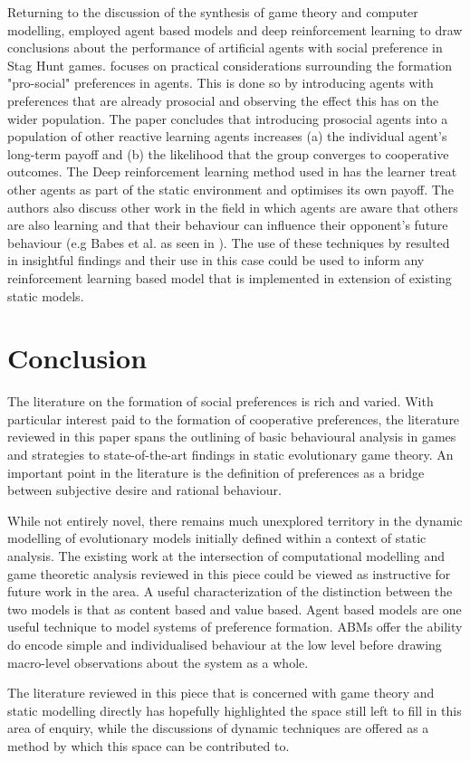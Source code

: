 \documentclass[11pt]{article}
\newcommand*{\np}{\par\noindent\newline}
\begin{document}
\np Returning to the discussion of the synthesis of game theory and computer modelling, \citet{peysakhovich_prosocial_2017} employed agent based models and deep reinforcement learning to draw conclusions about the
performance of artificial agents with social preference in Stag Hunt games. \citet{peysakhovich_prosocial_2017} focuses
on practical considerations surrounding the formation "pro-social" preferences in agents. This is done so by introducing
agents with preferences that are already prosocial and observing the effect this has on the wider population. The paper
concludes that introducing prosocial agents into a population of other reactive learning agents increases (a) the
individual agent's long-term payoff and (b) the likelihood that the group converges to cooperative outcomes.
The Deep reinforcement learning method used in \citet{peysakhovich_prosocial_2017} has the learner treat other agents as
part of the static environment and optimises its own payoff. The authors also discuss other work in the field in which
agents are aware that others are also learning and that their behaviour can influence their opponent's future behaviour
(e.g Babes et al. as seen in \citealt{peysakhovich_prosocial_2017}). The use of these techniques by 
\citet{peysakhovich_prosocial_2017} resulted in insightful findings and their use in this case could be used to inform any reinforcement learning based model that is implemented in extension of existing static models.


\section{Conclusion}\label{conc}
The literature on the formation of social preferences is rich and varied. With particular interest paid to the formation
of cooperative preferences, the literature reviewed in this paper spans the outlining of basic behavioural analysis in
games and strategies to state-of-the-art findings in static evolutionary game theory. An important point in the
literature is the definition of preferences as a bridge between subjective desire and rational behaviour. 

\np While not entirely novel, there remains much unexplored territory in the dynamic modelling of evolutionary models
initially defined within a context of static analysis. The existing work at the intersection of computational modelling
and game theoretic analysis reviewed in this piece could be viewed as instructive for future work in the area. A useful
characterization of the distinction between the two models is that as content based and value based. Agent based models
are one useful technique to model systems of preference formation. ABMs offer the ability do encode simple and
individualised behaviour at the low level before drawing macro-level observations about the system as a whole.

\np The literature reviewed in this piece that is concerned with game theory and static modelling directly has hopefully
highlighted the space still left to fill in this area of enquiry, while the discussions of dynamic techniques are offered as a method by which this space can be contributed to.
 
\newpage


\end{document}
